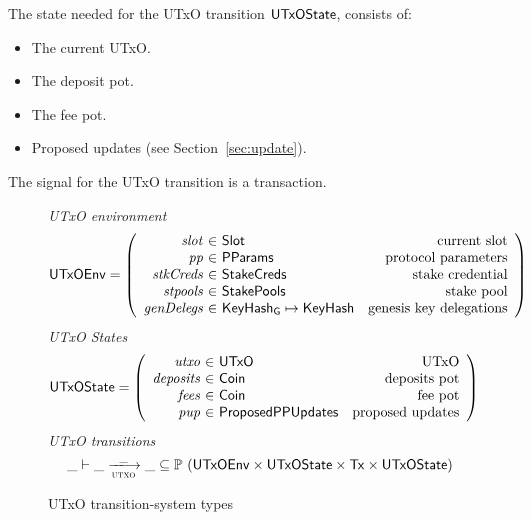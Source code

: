 The state needed for the UTxO transition $\mathsf{UTxOState}$, consists of:

\begin{itemize}
  \item The current UTxO.
  \item The deposit pot.
  \item The fee pot.
  \item Proposed updates (see Section~\ref{sec:update}).
\end{itemize}
The signal for the UTxO transition is a transaction.

\begin{figure}[htb]
  \emph{UTxO environment}
  \begin{equation*}
    \UTxOEnv =
    \left(
      \begin{array}{r@{~\in~}lr}
        \var{slot} & \Slot & \text{current slot}\\
        \var{pp} & \PParams & \text{protocol parameters}\\
        \var{stkCreds} & \StakeCreds & \text{stake credential}\\
        \var{stpools} & \StakePools & \text{stake pool}\\
        \var{genDelegs} & \KeyHashGen\mapsto\KeyHash & \text{genesis key delegations} \\
      \end{array}
    \right)
  \end{equation*}
  \emph{UTxO States}
  \begin{equation*}
    \UTxOState =
    \left(
      \begin{array}{r@{~\in~}lr}
        \var{utxo} & \UTxO & \text{UTxO}\\
        \var{deposits} & \Coin & \text{deposits pot}\\
        \var{fees} & \Coin & \text{fee pot}\\
        \var{pup} & \ProposedPPUpdates & \text{proposed updates}\\
      \end{array}
    \right)
  \end{equation*}
  \emph{UTxO transitions}
  \begin{equation*}
    \_ \vdash
    \var{\_} \trans{utxo}{\_} \var{\_}
    \subseteq \powerset (\UTxOEnv \times \UTxOState \times \Tx \times \UTxOState)
  \end{equation*}
  \caption{UTxO transition-system types}
  \label{fig:ts-types:utxo-shelley}
\end{figure}

